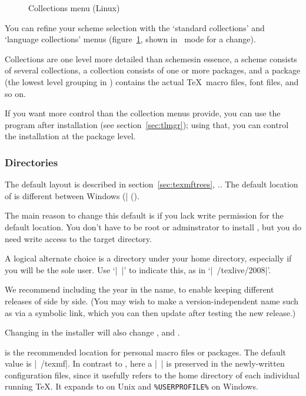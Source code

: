 \documentclass{article}
\begin{document}
\begin{figure}[tbh]
\caption{Collections menu (Linux)}\label{fig:collections-gui}
\end{figure}

You can refine your scheme selection with the `standard collections' and
`language collections' menus (figure~\ref{fig:collections-gui}, shown in
\GUI\ mode for a change).

Collections are one level more detailed than schemes\Dash in essence, a
scheme consists of several collections, a collection consists of one or
more packages, and a package (the lowest level grouping in \TL) contains
the actual \TeX\ macro files, font files, and so on.

If you want more control than the collection menus provide, you can use
the  program after installation (see
section~\ref{sec:tlmgr}); using that, you can control the installation
at the package level.  

\subsubsection{Directories}
\label{sec:directories}

The default layout is described in section~\ref{sec:texmftrees},
\p.\pageref{sec:texmftrees}. The default location of
 is different between Windows
(|%
().

The main reason to change this default is if you lack write permission
for the default location. You don't have to be root or adminstrator to
install \TL, but you do need write access to the target directory.

A logical alternate choice is a directory under your home directory,
especially if you will be the sole user. Use
`|~|' to indicate this, as in `|~/texlive/2008|'.

We recommend including the year in the name, to enable keeping different
releases of \TL{} side by side.  (You may wish to make a
version-independent name such as  via a
symbolic link, which you can then update after testing the new release.)

Changing  in the installer will also change
,  and
.

 is the recommended location for personal
macro files or packages.  The default value is |~/texmf|.  In
contrast to , here a |~| is preserved in the
newly-written configuration files, since it usefully refers to the home
directory of each individual running \TeX.  It expands to
 on Unix and \verb|%USERPROFILE%| on Windows.
\end{document}
